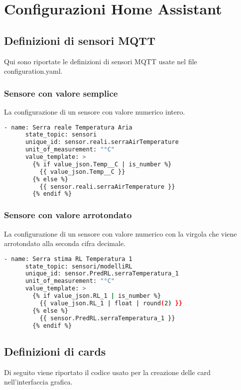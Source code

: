 

\chapter{Configurazioni Home Assistant}
\label{ch:hass-appendix}


\section{Definizioni di sensori MQTT}
\label{sec:hass-appendix-sensori}
Qui sono riportate le definizioni di sensori MQTT 
usate nel file configuration.yaml.

\subsection*{Sensore con valore semplice}
\label{sec:hass-appendix-sensori-normali}
La configurazione di un sensore con valore numerico intero. 
\begin{lstlisting}[language=bash]
    - name: Serra reale Temperatura Aria
      state_topic: sensori
      unique_id: sensor.reali.serraAirTemperature
      unit_of_measurement: "°C"
      value_template: >
        {% if value_json.Temp__C | is_number %}
          {{ value_json.Temp__C }}
        {% else %}
          {{ sensor.reali.serraAirTemperature }}
        {% endif %}
\end{lstlisting}


\subsection*{Sensore con valore arrotondato}
\label{sec:hass-appendix-sensori-float}
La configurazione di un sensore con valore numerico con la virgola 
che viene arrotondato alla seconda cifra decimale.
\begin{lstlisting}[language=bash]
    - name: Serra stima RL Temperatura 1
      state_topic: sensori/modelliRL
      unique_id: sensor.PredRL.serraTemperatura_1
      unit_of_measurement: "°C"
      value_template: >
        {% if value_json.RL_1 | is_number %}
          {{ value_json.RL_1 | float | round(2) }}
        {% else %}
          {{ sensor.PredRL.serraTemperatura_1 }}
        {% endif %}
\end{lstlisting}


\section{Definizioni di cards}
\label{sec:hass-appendix-plancia}
Di seguito viene riportato il codice usato per la creazione
delle card nell'interfaccia grafica.

